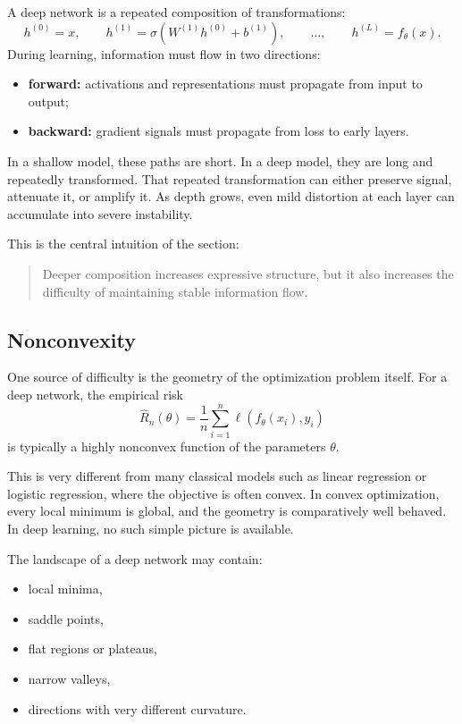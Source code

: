A deep network is a repeated composition of transformations:
\[
h^{(0)}=x,
\qquad
h^{(1)}=\sigma(W^{(1)}h^{(0)}+b^{(1)}),
\qquad
\dots,
\qquad
h^{(L)}=f_\theta(x).
\]
During learning, information must flow in two directions:

\begin{itemize}
    \item \textbf{forward:} activations and representations must propagate from input to output;
    \item \textbf{backward:} gradient signals must propagate from loss to early layers.
\end{itemize}

\medskip

In a shallow model, these paths are short.
In a deep model, they are long and repeatedly transformed.
That repeated transformation can either preserve signal, attenuate it, or amplify it.
As depth grows, even mild distortion at each layer can accumulate into severe instability.

\medskip

This is the central intuition of the section:

\begin{quote}
Deeper composition increases expressive structure, but it also increases the difficulty of maintaining stable information flow.
\end{quote}

\subsection*{Nonconvexity}

One source of difficulty is the geometry of the optimization problem itself.
For a deep network, the empirical risk
\[
\widehat{R}_n(\theta)
=
\frac{1}{n}\sum_{i=1}^n \ell(f_\theta(x_i),y_i)
\]
is typically a highly nonconvex function of the parameters \(\theta\).

\medskip

This is very different from many classical models such as linear regression or logistic regression, where the objective is often convex.
In convex optimization, every local minimum is global, and the geometry is comparatively well behaved.
In deep learning, no such simple picture is available.

\medskip

The landscape of a deep network may contain:
\begin{itemize}
    \item local minima,
    \item saddle points,
    \item flat regions or plateaus,
    \item narrow valleys,
    \item directions with very different curvature.
\end{itemize}

